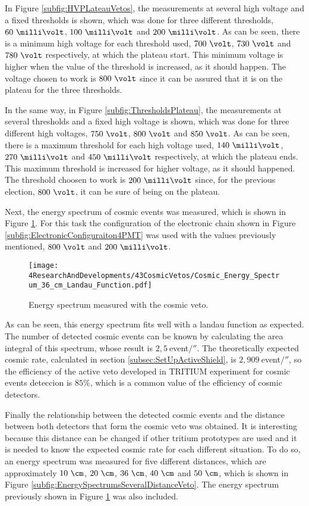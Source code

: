 In Figure \ref{subfig:HVPLateauVetos}, the measurements at several high voltage and a fixed thresholds is shown, which was done for three different thresholds, $60~\milli\volt$, $100~\milli\volt$ and $200~\milli\volt$. As can be seen, there is a minimum high voltage for each threshold used, $700~\volt$, $730~\volt$ and $780~\volt$ respectively, at which the plateau start. This minimum voltage is higher when the value of the threshold is increased, as it should happen. The voltage chosen to work is $800~\volt$ since it can be assured that it is on the plateau for the three thresholds.

In the same way, in Figure \ref{subfig:ThresholdsPlateau}, the measurements at several thresholds and a fixed high voltage is shown, which was done for three different high voltages, $750~\volt$, $800~\volt$ and $850~\volt$. As can be seen, there is a maximum threshold for each high voltage used,  $140~\milli\volt$, $270~\milli\volt$ and $450~\milli\volt$ respectively, at which the plateau ends. This maximum threshold is increased for higher voltage, as it should happened. The threshold choosen to work is $200~\milli\volt$ since, for the previous election, $800~\volt$, it can be sure of being on the plateau. 

Next, the energy spectrum of cosmic events was measured, which is shown in Figure \ref{fig:EnergySpectrumCosmicVeto}. For this task the configuration of the electronic chain shown in Figure \ref{subfig:ElectronicConfiguraiton4PMT} was used with the values previously mentioned, $800~\volt$ and $200~\milli\volt$. 

\begin{figure}[h]
\centering
\texttt{[image: 4ResearchAndDevelopments/43CosmicVetos/Cosmic\_Energy\_Spectrum\_36\_cm\_Landau\_Function.pdf]}
\caption{Energy spectrum measured with the cosmic veto.\label{fig:EnergySpectrumCosmicVeto}}
\end{figure}

As can be seen, this energy spectrum fits well with a landau function as expected. The number of detected cosmic events can be known by calculating the area integral of this spectrum, whose result is $2,5~$event$/\second$. The theoretically expected cosmic rate, calculated in section \ref{subsec:SetUpActiveShield}, is $2,909~$event$/\second$, so the efficiency of the active veto developed in TRITIUM experiment for cosmic events deteccion is $85\%$, which is a common value of the efficiency of cosmic detectors.

Finally the relationship between the detected cosmic events and the distance between both detectors that form the cosmic veto was obtained. It is interesting because this distance can be changed if other tritium prototypes are used and it is needed to know the expected cosmic rate for each different situation. To do so, an energy spectrum was measured for five different distances, which are approximately $10~\cm$, $20~\cm$, $36~\cm$, $40~\cm$ and $50~\cm$, which is shown in Figure \ref{subfig:EnergySpectrumsSeveralDistanceVeto}. The energy spectrum previously shown in Figure \ref{fig:EnergySpectrumCosmicVeto} was also included. 

